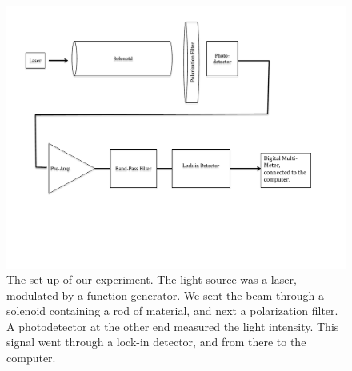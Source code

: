 \documentclass[prb,preprint]{revtex4-1}
\begin{document}
\begin{figure}[h!]
\centering
\includegraphics[width=6in]{Faraday_lab_set-up.pdf}
\caption{The set-up of our experiment. The light source was a laser, modulated by a function generator. We sent the beam through a solenoid containing a rod of material, and next a polarization filter. A photodetector at the other end measured the light intensity. This signal went through a  lock-in detector, and from there to the computer.}
\label{set-up}
\end{figure}
\end{document}
